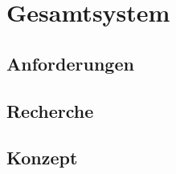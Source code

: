 \chapter{Gesamtsystem}
\label{ch:SYS}

\section{Anforderungen}
\label{sec:SYS_anforderungen}

\section{Recherche}
\label{sec:SYS_recherche}

\section{Konzept}
\label{sec:SYS_konzept}	